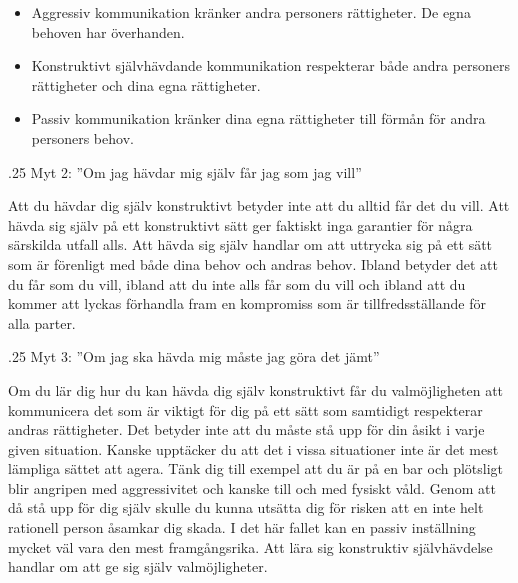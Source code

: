\documentclass[swedish,a4paper]{book}
\makeatletter
\renewcommand\subsection{\@startsection{subsection}{1}{\z@}%
                                   {\baselineskip}%
                                   {.25\baselineskip}%
                                   {\fontsize{1\baselineskip}{1.25\baselineskip}\selectfont\sffamily\bfseries}} %
\makeatother
\begin{document}
\begin{itemize}
\item
  Aggressiv kommunikation kränker andra personers rättigheter. De egna
  behoven har överhanden.
\item
  Konstruktivt självhävdande kommunikation respekterar både andra
  personers rättigheter och dina egna rättigheter.
\item
  Passiv kommunikation kränker dina egna rättigheter till förmån för
  andra personers behov.
\end{itemize}

\subsection{Myt 2: ''Om jag hävdar mig själv får jag som jag vill''}\label{myt-2}

Att du hävdar dig själv konstruktivt betyder inte att du alltid får det
du vill. Att hävda sig själv på ett konstruktivt sätt ger faktiskt inga
garantier för några särskilda utfall alls. Att hävda sig själv handlar
om att uttrycka sig på ett sätt som är förenligt med både dina behov och
andras behov. Ibland betyder det att du får som du vill,
ibland att du inte alls får som du vill och ibland att du kommer att
lyckas förhandla fram en kompromiss som är tillfredsställande för alla parter.

\subsection{Myt 3: ''Om jag ska hävda mig måste jag göra det jämt''}\label{myt-3}

Om du lär dig hur du kan hävda dig själv konstruktivt får du
valmöjligheten att kommunicera det som är viktigt för dig på ett sätt
som samtidigt respekterar andras rättigheter. Det betyder inte att du
måste stå upp för din åsikt i varje given situation. Kanske upptäcker du
att det i vissa situationer inte är det mest lämpliga sättet att agera.
Tänk dig till exempel att du är på en bar och plötsligt blir angripen
med aggressivitet och kanske till och med fysiskt våld. Genom att då stå upp
för dig själv skulle du kunna utsätta dig för risken att en inte helt
rationell person åsamkar dig skada. I det här fallet kan en passiv
inställning mycket väl vara den mest framgångsrika. Att lära sig
konstruktiv självhävdelse handlar om att ge sig själv valmöjligheter.
\end{document}
